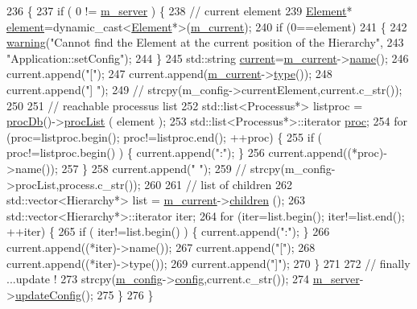 \begin{DoxyCode}
236                              \{
237   \textcolor{keywordflow}{if} ( 0 != \hyperlink{classApplication_a5e6085b0f322d5036177b16113a75b56}{m\_server} ) \{
238     \textcolor{comment}{// current element}
239     \hyperlink{classElement}{Element}* \hyperlink{namespaceelement}{element}=\textcolor{keyword}{dynamic\_cast<}\hyperlink{classElement}{Element}*\textcolor{keyword}{>}(\hyperlink{classApplication_ab0fd877a3c66c41b22109863e1719ccd}{m\_current});
240     \textcolor{keywordflow}{if} (0==element)
241       \{
242     \hyperlink{classObject_a65cd4fda577711660821fd2cd5a3b4c9}{warning}(\textcolor{stringliteral}{"Cannot find the Element at the current position of the Hierarchy"},
243         \textcolor{stringliteral}{"Application::setConfig"});
244       \}
245     std::string \hyperlink{classApplication_af25c880ff1e95d863ed058396754a76e}{current}=\hyperlink{classApplication_ab0fd877a3c66c41b22109863e1719ccd}{m\_current}->\hyperlink{classObject_a300f4c05dd468c7bb8b3c968868443c1}{name}();
246     current.append(\textcolor{stringliteral}{"["});
247     current.append(\hyperlink{classApplication_ab0fd877a3c66c41b22109863e1719ccd}{m\_current}->\hyperlink{classObject_a84f99f70f144a83e1582d1d0f84e4e62}{type}());
248     current.append(\textcolor{stringliteral}{"] "});
249     \textcolor{comment}{//    strcpy(m\_config->currentElement,current.c\_str());}
250 
251     \textcolor{comment}{// reachable processus list}
252     std::list<Processus*> listproc = \hyperlink{classApplication_aa5c28af1a7e1c41dada2db2a4d03c57d}{procDb}()->\hyperlink{classProcDataBase_a8145de34e9857f3f6eebd2572740f198}{procList} ( element );
253     std::list<Processus*>::iterator \hyperlink{namespaceproc}{proc};
254     \textcolor{keywordflow}{for} (proc=listproc.begin(); proc!=listproc.end(); ++proc) \{
255       \textcolor{keywordflow}{if} ( proc!=listproc.begin() ) \{ current.append(\textcolor{stringliteral}{":"}); \}
256       current.append((*proc)->name());
257     \}
258     current.append(\textcolor{stringliteral}{" "});
259     \textcolor{comment}{//    strcpy(m\_config->procList,process.c\_str());}
260 
261     \textcolor{comment}{// list of children}
262     std::vector<Hierarchy*> list = \hyperlink{classApplication_ab0fd877a3c66c41b22109863e1719ccd}{m\_current}->\hyperlink{classHierarchy_aa9a76f69e98e052ee1a6e32cea006288}{children} ();
263     std::vector<Hierarchy*>::iterator iter;
264     \textcolor{keywordflow}{for} (iter=list.begin(); iter!=list.end(); ++iter) \{
265       \textcolor{keywordflow}{if} ( iter!=list.begin() ) \{ current.append(\textcolor{stringliteral}{":"}); \}
266       current.append((*iter)->name());
267       current.append(\textcolor{stringliteral}{"["});
268       current.append((*iter)->type());
269       current.append(\textcolor{stringliteral}{"]"});
270     \}
271 
272     \textcolor{comment}{// finally ...update !}
273     strcpy(\hyperlink{classApplication_ae05f3e253ea871a194c3d30fd1d3b0c3}{m\_config}->\hyperlink{classConfig_a4f977190294b342f444cacd04f0e909b}{config},current.c\_str());
274     \hyperlink{classApplication_a5e6085b0f322d5036177b16113a75b56}{m\_server}->\hyperlink{classServer_af58d60a5587813e2aab7fc9016dfa01a}{updateConfig}();
275   \}
276 \}
\end{DoxyCode}
